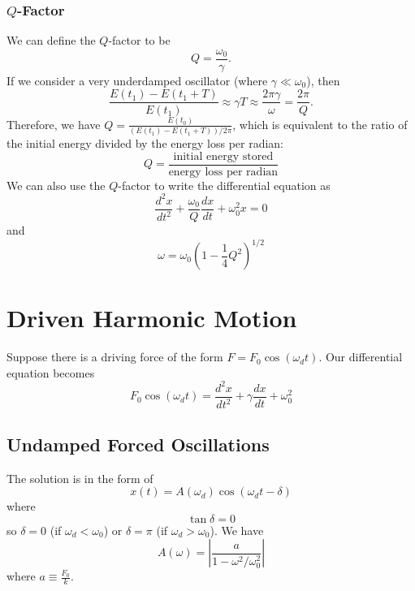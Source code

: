 \documentclass{article}
\begin{document}
\subsubsection{$Q$-Factor}
We can define the $Q$-factor to be 
\begin{equation}
    \boxed{Q = \frac{\omega_0}{\gamma}}.
\end{equation}
If we consider a very underdamped oscillator (where $\gamma \ll \omega_0$), then 
\begin{equation}
    \frac{E(t_1)-E(t_1+T)}{E(t_1)} \approx \gamma T \approx \frac{2\pi \gamma}{\omega} = \frac{2\pi}{Q}.
\end{equation}
Therefore, we have $Q = \frac{E(t_0)}{(E(t_1)-E(t_1+T))/2\pi}$, which is equivalent to the ratio of the initial energy divided by the energy loss per radian: 
\begin{equation}
    \boxed{Q = \frac{\text{initial energy stored}}{\text{energy loss per radian}}}
\end{equation}
We can also use the $Q$-factor to write the differential equation as 
\begin{equation}
    \frac{d^2x}{dt^2}+\frac{\omega_0}{Q}\frac{dx}{dt}+\omega_0^2 x = 0
\end{equation}
and 
\begin{equation}
    \omega = \omega_0\left(1-\frac{1}{4}Q^2\right)^{1/2}
\end{equation}
\newpage
\section{Driven Harmonic Motion}
Suppose there is a driving force of the form $F=F_0\cos(\omega_d t).$ Our differential equation becomes 
\begin{equation}
    F_0\cos(\omega_d t) = \frac{d^2x}{dt^2}+\gamma \frac{dx}{dt} + \omega_0^2 
\end{equation}
\subsection{Undamped Forced Oscillations}
The solution is in the form of 
\begin{equation}
    x(t) = A(\omega_d)\cos(\omega_d t - \delta)
\end{equation}
where 
\begin{equation}
    \tan\delta = 0
\end{equation}
so $\delta = 0$ (if $\omega_d < \omega_0$) or $\delta = \pi$ (if $\omega_d > \omega_0$). We have
\begin{equation}
    A(\omega) = \left|\frac{a}{1-\omega^2/\omega_0^2}\right|
\end{equation}
where $a \equiv \frac{F_0}{k}.$
\end{document}
